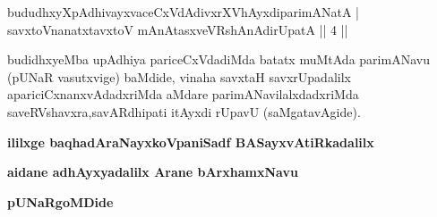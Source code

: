 
\begin{shl}
bududhxyXpAdhivayxvaceCxVdAdivxrXVhAyxdiparimANatA | \\
savxtoV\s nanatxtavxtoV mAnAtasxveVRshAnAdirUpatA \hfill ||  4 || 
\end{shl}

\begin{artha}
budidhxyeMba upAdhiya pariceCxVdadiMda batatx muMtAda parimANavu (pUNaR vasutxvige) baMdide, vinaha savxtaH savxrUpadalilx apariciCxnanxvAdadxriMda aMdare parimANavilalxdadxriMda saveRVshavxra,\break savARdhipati itAyxdi rUpavU (saMgatavAgide).
\end{artha}




\begin{center}
{\bf ililxge baqhadAraNayxkoVpaniSadf BASayxvAtiRkadalilx}
\smallskip

{\bf aidane adhAyxyadalilx Arane bArxhamxNavu}
\smallskip

{\bf pUNaRgoMDide}
\end{center}
